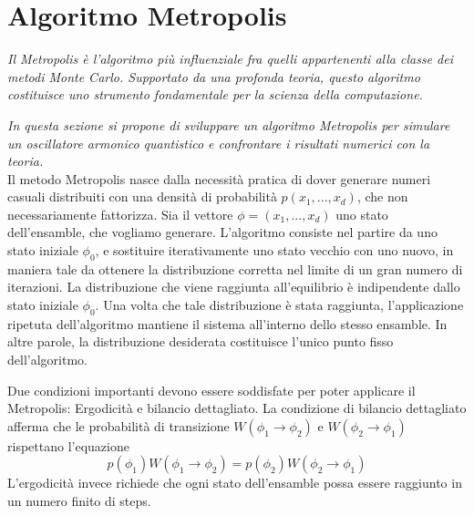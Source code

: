 \chapter{\huge Algoritmo Metropolis}

\textit{Il Metropolis è l'algoritmo più influenziale fra quelli appartenenti alla classe dei metodi Monte Carlo. Supportato da una profonda teoria, questo algoritmo costituisce uno strumento fondamentale per la scienza della computazione.}

\textit{In questa sezione si propone di sviluppare un algoritmo Metropolis per simulare un oscillatore armonico quantistico e confrontare i risultati numerici con la teoria.}
\\

Il metodo Metropolis nasce dalla necessità pratica di dover generare numeri casuali distribuiti con una densità di probabilità $p(x_1,...,x_d)$, che non necessariamente fattorizza. Sia il vettore $\phi = (x_1,...,x_d)$ uno stato dell'ensamble, che vogliamo generare. L'algoritmo consiste nel partire da uno stato iniziale $\phi_0$, e sostituire iterativamente uno stato vecchio con uno nuovo, in maniera tale da ottenere la distribuzione corretta nel limite di un gran numero di iterazioni. La distribuzione che viene raggiunta all'equilibrio è indipendente dallo stato iniziale $\phi_0$. Una volta che tale distribuzione è stata raggiunta, l'applicazione ripetuta dell'algoritmo mantiene il sistema all'interno dello stesso ensamble. In altre parole, la distribuzione desiderata costituisce l'unico punto fisso dell'algoritmo.

Due condizioni importanti devono essere soddisfate per poter applicare il Metropolis: Ergodicità e bilancio dettagliato. La condizione di bilancio dettagliato afferma che le probabilità di transizione $W(\phi_1\rightarrow\phi_2)$ e $W(\phi_2\rightarrow\phi_1)$ rispettano l'equazione $$p(\phi_1)W(\phi_1\rightarrow\phi_2) = p(\phi_2)W(\phi_2\rightarrow\phi_1)$$
L'ergodicità invece richiede che ogni stato dell'ensamble possa essere raggiunto in un numero finito di steps.

